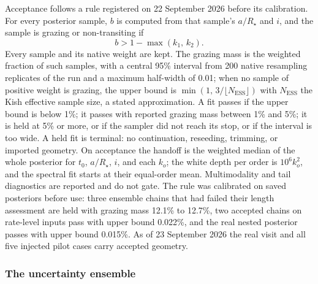 Acceptance follows a rule registered on 22 September 2026 before its
calibration. For every posterior sample, $b$ is computed from that
sample's $a/R_\star$ and $i$, and the sample is grazing or
non-transiting if
\begin{equation}
 b > 1-\max(k_1,\,k_2).
 \label{eq:grazing}
\end{equation}
Every sample and its native weight are kept. The grazing mass is the
weighted fraction of such samples, with a central 95\% interval from 200
native resampling replicates of the run and a maximum half-width of
0.01; when no sample of positive weight is grazing, the upper bound is
$\min(1,\,3/\lfloor N_{\mathrm{ESS}}\rfloor)$ with $N_{\mathrm{ESS}}$ the
Kish effective sample size, a stated approximation. A fit passes if the
upper bound is below 1\%; it passes with reported grazing mass between
1\% and 5\%; it is held at 5\% or more, or if the sampler did not reach
its stop, or if the interval is too wide. A held fit is terminal: no
continuation, reseeding, trimming, or imported geometry. On acceptance
the handoff is the weighted median of the whole posterior for $t_0$,
$a/R_\star$, $i$, and each $k_o$; the white depth per order is
$10^6 k_o^2$, and the spectral fit starts at their equal-order mean.
Multimodality and tail diagnostics are reported and do not gate. The
rule was calibrated on saved posteriors before use: three ensemble
chains that had failed their length assessment are held with grazing
mass 12.1\% to 12.7\%, two accepted chains on rate-level inputs pass with
upper bound 0.022\%, and the real nested posterior passes with upper
bound 0.015\%. As of 23 September 2026 the real visit and all five
injected pilot cases carry accepted geometry.

\subsubsection{The uncertainty ensemble}
\label{sec:ensemble}


